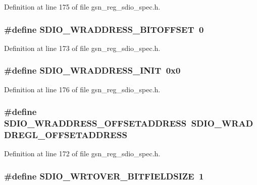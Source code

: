 Definition at line 175 of file gsn\_\-reg\_\-sdio\_\-spec.h.

\hypertarget{a00571_a037f92d603c2bba7f5ebd0144cec74cb}{
\subsubsection[{SDIO\_\-WRADDRESS\_\-BITOFFSET}]{\setlength{\rightskip}{0pt plus 5cm}\#define SDIO\_\-WRADDRESS\_\-BITOFFSET~0}}
\label{a00571_a037f92d603c2bba7f5ebd0144cec74cb}


Definition at line 173 of file gsn\_\-reg\_\-sdio\_\-spec.h.

\hypertarget{a00571_a391ed00f714f565adc17e8aa69fc3b58}{
\subsubsection[{SDIO\_\-WRADDRESS\_\-INIT}]{\setlength{\rightskip}{0pt plus 5cm}\#define SDIO\_\-WRADDRESS\_\-INIT~0x0}}
\label{a00571_a391ed00f714f565adc17e8aa69fc3b58}


Definition at line 176 of file gsn\_\-reg\_\-sdio\_\-spec.h.

\hypertarget{a00571_acbe191ee91abebdaa4e445b7c7913516}{
\subsubsection[{SDIO\_\-WRADDRESS\_\-OFFSETADDRESS}]{\setlength{\rightskip}{0pt plus 5cm}\#define SDIO\_\-WRADDRESS\_\-OFFSETADDRESS~SDIO\_\-WRADDREGL\_\-OFFSETADDRESS}}
\label{a00571_acbe191ee91abebdaa4e445b7c7913516}


Definition at line 172 of file gsn\_\-reg\_\-sdio\_\-spec.h.

\hypertarget{a00571_aee3d4b9d8273eac7dac60df4455a2771}{
\subsubsection[{SDIO\_\-WRTOVER\_\-BITFIELDSIZE}]{\setlength{\rightskip}{0pt plus 5cm}\#define SDIO\_\-WRTOVER\_\-BITFIELDSIZE~1}}
\label{a00571_aee3d4b9d8273eac7dac60df4455a2771}


